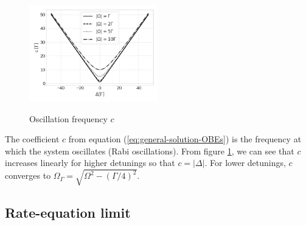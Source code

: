{\begin{figure}[!ht]
	\centering
	\caption{Oscillation frequency $ c $}
	\vspace{-10pt}
	\includegraphics[width=0.5\textwidth]{USPSC-img/oscillation_frequency_c.png}
	\label{fig:oscillation-frequency-c}
	\vspace{-15pt}
\end{figure}

The coefficient $ c $ from equation (\ref{eq:general-solution-OBEs}) is the frequency at which the system oscillates (Rabi oscillations). From figure \ref{fig:oscillation-frequency-c}, we can see that $ c $ increases linearly for higher detunings so that $ c = |\Delta| $. For lower detunings, $ c $ converges to $ \Omega_{\Gamma} = \sqrt{\Omega^2 - (\Gamma/4)^2} $.

\subsection{Rate-equation limit}
\label{sec:rate-equation-limit}

}
